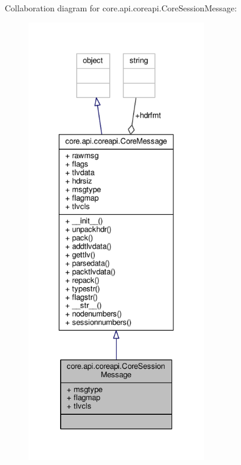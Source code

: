 Collaboration diagram for core.\+api.\+coreapi.\+Core\+Session\+Message\+:
\nopagebreak
\begin{figure}[H]
\begin{center}
\leavevmode
\includegraphics[height=550pt]{classcore_1_1api_1_1coreapi_1_1_core_session_message__coll__graph}
\end{center}
\end{figure}
